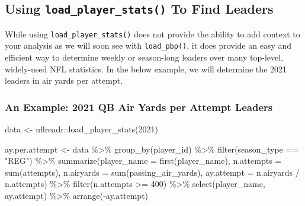 \documentclass[
  letterpaper,
]{krantz}
\newenvironment{Shaded}{\begin{snugshade}}{\end{snugshade}}
\newcommand{\AttributeTok}[1]{\textcolor[rgb]{0.40,0.45,0.13}{#1}}
\newcommand{\DecValTok}[1]{\textcolor[rgb]{0.68,0.00,0.00}{#1}}
\newcommand{\FunctionTok}[1]{\textcolor[rgb]{0.28,0.35,0.67}{#1}}
\newcommand{\NormalTok}[1]{\textcolor[rgb]{0.00,0.23,0.31}{#1}}
\newcommand{\OtherTok}[1]{\textcolor[rgb]{0.00,0.23,0.31}{#1}}
\newcommand{\SpecialCharTok}[1]{\textcolor[rgb]{0.37,0.37,0.37}{#1}}
\newcommand{\StringTok}[1]{\textcolor[rgb]{0.13,0.47,0.30}{#1}}
\begin{document}
\hypertarget{using-load_player_stats-to-find-leaders}{%
\subsection{\texorpdfstring{Using \texttt{load\_player\_stats()} To Find
Leaders}{Using load\_player\_stats() To Find Leaders}}\label{using-load_player_stats-to-find-leaders}}

While using \texttt{load\_player\_stats()} does not provide the ability
to add context to your analysis as we will soon see with
\texttt{load\_pbp()}, it does provide an easy and efficient way to
determine weekly or season-long leaders over many top-level, widely-used
NFL statistics. In the below example, we will determine the 2021 leaders
in air yards per attempt.

\hypertarget{an-example-2021-qb-air-yards-per-attempt-leaders}{%
\subsubsection{An Example: 2021 QB Air Yards per Attempt
Leaders}\label{an-example-2021-qb-air-yards-per-attempt-leaders}}

\begin{Shaded}
\begin{Highlighting}[]
\NormalTok{data }\OtherTok{\textless{}{-}}\NormalTok{ nflreadr}\SpecialCharTok{::}\FunctionTok{load\_player\_stats}\NormalTok{(}\DecValTok{2021}\NormalTok{)}

\NormalTok{ay.per.attempt }\OtherTok{\textless{}{-}}\NormalTok{ data }\SpecialCharTok{\%\textgreater{}\%}
  \FunctionTok{group\_by}\NormalTok{(player\_id) }\SpecialCharTok{\%\textgreater{}\%}
  \FunctionTok{filter}\NormalTok{(season\_type }\SpecialCharTok{==} \StringTok{"REG"}\NormalTok{) }\SpecialCharTok{\%\textgreater{}\%}
  \FunctionTok{summarize}\NormalTok{(}\AttributeTok{player\_name =} \FunctionTok{first}\NormalTok{(player\_name),}
            \AttributeTok{n.attempts =} \FunctionTok{sum}\NormalTok{(attempts),}
            \AttributeTok{n.airyards =} \FunctionTok{sum}\NormalTok{(passing\_air\_yards),}
            \AttributeTok{ay.attempt =}\NormalTok{ n.airyards }\SpecialCharTok{/}\NormalTok{ n.attempts) }\SpecialCharTok{\%\textgreater{}\%}
  \FunctionTok{filter}\NormalTok{(n.attempts }\SpecialCharTok{\textgreater{}=} \DecValTok{400}\NormalTok{) }\SpecialCharTok{\%\textgreater{}\%}
  \FunctionTok{select}\NormalTok{(player\_name, ay.attempt) }\SpecialCharTok{\%\textgreater{}\%}
  \FunctionTok{arrange}\NormalTok{(}\SpecialCharTok{{-}}\NormalTok{ay.attempt)}
\end{Highlighting}
\end{Shaded}
\end{document}
